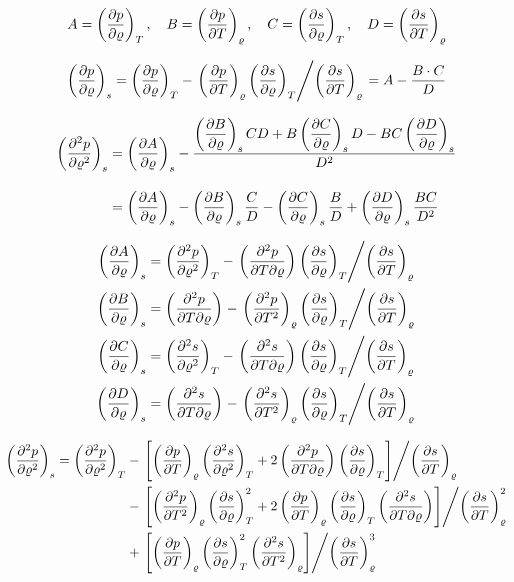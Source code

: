 \documentclass{article}
\begin{document}
\begin{equation}
A = \der{p}{\varrho}{T} ,\quad  
B  = \der{p}{T}{\varrho} ,\quad 
C  = \der{s}{\varrho}{T} ,\quad 
D  = \der{s}{T}{\varrho}
\end{equation}

\begin{equation}
\der{p}{\varrho}{s} = \der{p}{\varrho}{T}- \left. \der{p}{T}{\varrho}\der{s}{\varrho}{T} \middle/ \der{s}{T}{\varrho} \right. = A - \frac{B\cdot C}{D}
\end{equation}

\begin{align}
\der{^2p}{\varrho^2}{s} &= \der{A}{\varrho}{s} -\frac{\der{B}{\varrho}{s} C D + B \der{C}{\varrho}{s} D - B C \der{D}{\varrho}{s} }{D^2} 
\\[10pt] &= \der{A}{\varrho}{s} - \der{B}{\varrho}{s}\frac{C}{D} - \der{C}{\varrho}{s}\frac{B}{D} + \der{D}{\varrho}{s}\frac{BC}{D^2}
\end{align}

\begin{align}
\der{A}{\varrho}{s} &= \der{^2p}{\varrho^2}{T} - \left. \der{^2p}{T\partial\varrho}{} \der{s}{\varrho}{T} \middle/ \der{s}{T}{\varrho} \right. \\
\der{B}{\varrho}{s} &= \der{^2p}{T\partial\varrho}{} - \left. \der{^2p}{T^2}{\varrho} \der{s}{\varrho}{T} \middle/ \der{s}{T}{\varrho} \right. \\
\der{C}{\varrho}{s} &= \der{^2s}{\varrho^2}{T} - \left. \der{^2s}{T\partial\varrho}{} \der{s}{\varrho}{T} \middle/ \der{s}{T}{\varrho} \right. \\
\der{D}{\varrho}{s} &= \der{^2s}{T\partial\varrho}{} - \left. \der{^2s}{T^2}{\varrho} \der{s}{\varrho}{T} \middle/ \der{s}{T}{\varrho} \right. 
\end{align}

\begin{equation}
\begin{split}
\der{^2p}{\varrho^2}{s} = \der{^2p}{\varrho^2}{T} 
&- \left. \left[\der{p}{T}{\varrho} \der{^2s}{\varrho^2}{T} + 2 \der{^2p}{T\partial\varrho}{} \der{s}{\varrho}{T} \right] \middle/ \der{s}{T}{\varrho} \right. \\
&- \left. \left[ \der{^2p}{T^2}{\varrho} \der{s}{\varrho}{T}^2 + 2 \der{p}{T}{\varrho} \der{s}{\varrho}{T} \der{^2s}{T\partial\varrho}{} \right] \middle/ \der{s}{T}{\varrho}^{2} \right. \\
&+ \left. \left[ \der{p}{T}{\varrho} \der{s}{\varrho}{T}^2 \der{^2s}{T^2}{\varrho} \right] \middle/ \der{s}{T}{\varrho}^{3} \right.
\end{split}
\end{equation}
\end{document}
